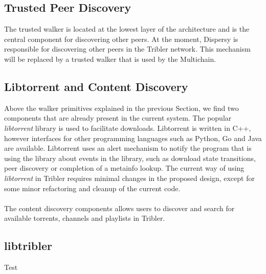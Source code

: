 \subsection{Trusted Peer Discovery}
The trusted walker is located at the lowest layer of the architecture and is the central component for discovering other peers. At the moment, Dispersy is responsible for discovering other peers in the Tribler network. This mechanism will be replaced by a trusted walker that is used by the Multichain.

\subsection{Libtorrent and Content Discovery}
Above the walker primitives explained in the previous Section, we find two components that are already present in the current system. The popular \emph{libtorrent} library is used to facilitate downloads. Libtorrent is written in C++, however interfaces for other programming languages such as Python, Go and Java are available. Libtorrent uses an alert mechanism to notify the program that is using the library about events in the library, such as download state transitions, peer discovery or completion of a metainfo lookup. The current way of using \emph{libtorrent} in Tribler requires minimal changes in the proposed design, except for some minor refactoring and cleanup of the current code.\\\\
The content discovery components allows users to discover and search for available torrents, channels and playlists in Tribler.

\subsection{libtribler}
Test



